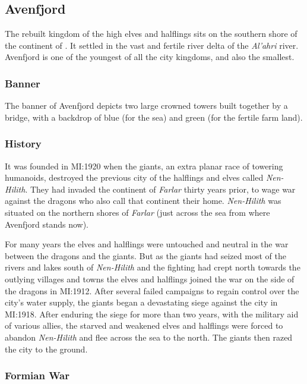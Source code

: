 \subsection{Avenfjord}
\label{sec:Avenfjord}

The rebuilt kingdom of the high elves and halflings sits on the southern shore
of the continent of . It settled in the vast and fertile
river delta of the \emph{Al'ahri} river. Avenfjord is one of the youngest of
all the city kingdoms, and also the smallest.

\subsubsection{Banner}

The banner of Avenfjord depicts two large crowned towers built together by
a bridge, with a backdrop of blue (for the sea) and green (for the fertile
farm land).

\subsubsection{History}

It was founded in MI:1920 when the giants, an extra planar race of towering
humanoids, destroyed the previous city of the halflings and elves called
\emph{Nen-Hilith}. They had invaded the continent of \emph{Farlar} thirty
years prior, to wage war against the dragons who also call that continent
their home. \emph{Nen-Hilith} was situated on the northern shores of
\emph{Farlar} (just across the sea from where Avenfjord stands now).

For many years the elves and halflings were untouched and neutral in the
war between the dragons and the giants. But as the giants had seized most of
the rivers and lakes south of \emph{Nen-Hilith} and the fighting had crept
north towards the outlying villages and towns the elves and halflings joined
the war on the side of the dragons in MI:1912. After several failed campaigns
to regain control over the city's water supply, the giants began a devastating
siege against the city in MI:1918. After enduring the siege for more than two
years, with the military aid of various allies, the starved and weakened elves
and halflings were forced to abandon \emph{Nen-Hilith} and flee across the sea
to the north. The giants then razed the city to the ground.

\subsubsection{Formian War}
\label{sec:Formian War}

